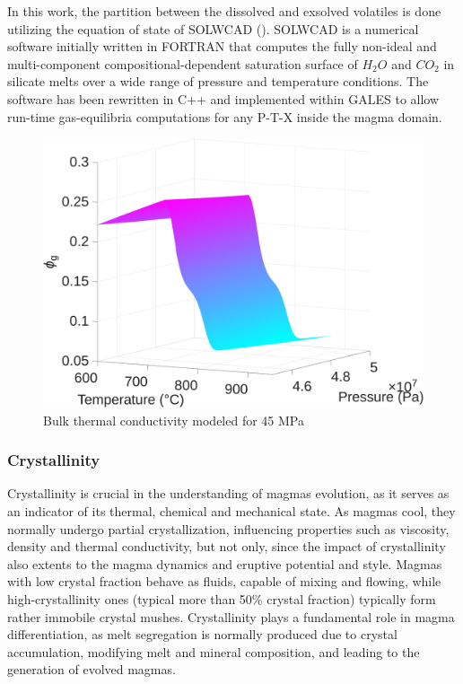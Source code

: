 In this work, the partition between the dissolved and exsolved volatiles is done utilizing the equation of state of SOLWCAD (\cite{papale2006}). SOLWCAD is a numerical software initially written in FORTRAN that computes the fully non-ideal and multi-component compositional-dependent saturation surface of $H_2O$ and $CO_2$ in silicate melts over a wide range of pressure and temperature conditions. The software has been rewritten in C++ and implemented within GALES  to allow run-time gas-equilibria computations for any P-T-X inside the magma domain. 

\begin{figure}
	\centering
	\includegraphics[width=1\linewidth]{img/chapter2/properties/vf_g/vf_g.png}
	\caption{Bulk thermal conductivity modeled for 45 MPa}
	\label{fig:volume_gas}
\end{figure}

\subsubsection{Crystallinity}
Crystallinity is crucial in the understanding of magmas evolution, as it serves as an indicator of its thermal, chemical and mechanical state. As magmas cool, they normally undergo partial crystallization, influencing properties such as viscosity, density and thermal conductivity, but not only, since the impact of crystallinity also extents to the magma dynamics and eruptive potential and style. Magmas with low crystal fraction behave as fluids, capable of mixing and flowing, while high-crystallinity ones (typical more than 50\% crystal fraction) typically form rather immobile crystal mushes. Crystallinity plays a fundamental role in magma differentiation, as melt segregation is normally produced due to crystal accumulation, modifying melt and mineral composition, and leading to the generation of evolved magmas.

